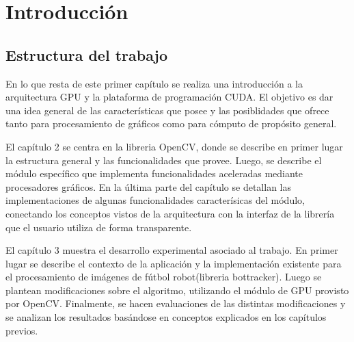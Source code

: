 \documentclass[a4paper,10pt]{report}
\begin{document}
\chapter{Introducción}

\section{Estructura del trabajo}
En lo que resta de este primer capítulo se realiza una introducción a la arquitectura GPU y la plataforma de programación CUDA. 
El objetivo es dar una idea general de las características que posee y las posiblidades que ofrece tanto para procesamiento de gráficos como para cómputo de propósito general.


El capítulo 2 se centra en la libreria OpenCV, donde se describe en primer lugar la estructura general y las funcionalidades que provee. 
Luego, se describe el módulo específico que implementa funcionalidades aceleradas mediante procesadores gráficos.
En la última parte del capítulo se detallan las implementaciones de algunas funcionalidades caracterísicas del módulo, conectando los conceptos vistos de la arquitectura con la interfaz de la librería que el usuario utiliza de forma transparente. 


El capítulo 3 muestra el desarrollo experimental asociado al trabajo. En primer lugar se describe el contexto de la aplicación y la implementación existente para el procesamiento de imágenes de fútbol robot(libreria bottracker).
Luego se plantean modificaciones sobre el algoritmo, utilizando el módulo de GPU provisto por OpenCV. Finalmente, se hacen evaluaciones de las distintas modificaciones y se analizan los resultados basándose en conceptos explicados en los capítulos previos.
\end{document}
